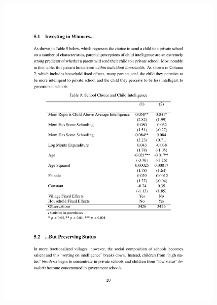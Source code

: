 \documentclass{beamer}
\begin{document}
\begin{frame}{}
	\begin{figure}[htb]
		\begin{center}
		\includegraphics[scale=0.7]{tables/intelligence_type.pdf}
		\end{center}
	\end{figure}
\end{frame}
\end{document}
